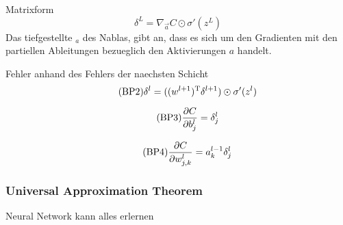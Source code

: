 \documentclass[../main]{subfiles}
\begin{document}
Matrixform
\begin{equation}\tag{BP1a}
  \delta^L = \nabla_{\vec{a}}C \odot \sigma'(z^L)
\end{equation}
Das tiefgestellte $_a$ des Nablas, gibt an, dass es sich um den Gradienten mit den partiellen
Ableitungen bezueglich den Aktivierungen $a$ handelt.

Fehler anhand des Fehlers der naechsten Schicht
\begin{equation}\tag{BP2}
  \delta^l = ((w^{l+1})^\mathrm{T} \delta^{l+1}) \odot \sigma'(z^l)
\end{equation}

\begin{equation}\tag{BP3}
  \frac{\partial C}{\partial b_j^l} = \delta_j^l
\end{equation}

\begin{equation}\tag{BP4}
  \frac{\partial C}{\partial w_{j,k}^l} = a_k^{l-1} \delta_j^l
\end{equation}



\subsubsection{Universal Approximation Theorem}\label{sec:UAT}
Neural Network kann alles erlernen

\pagebreak
\end{document}
